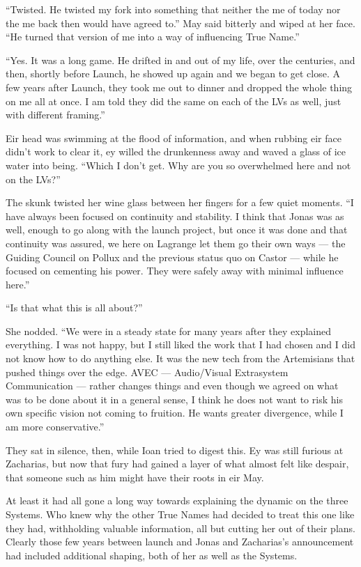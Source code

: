 ``Twisted. He twisted my fork into something that neither the me of today nor the me back then would have agreed to.'' May said bitterly and wiped at her face. ``He turned that version of me into a way of influencing True Name.''

``Yes. It was a long game. He drifted in and out of my life, over the centuries, and then, shortly before Launch, he showed up again and we began to get close. A few years after Launch, they took me out to dinner and dropped the whole thing on me all at once. I am told they did the same on each of the LVs as well, just with different framing.''

Eir head was swimming at the flood of information, and when rubbing eir face didn't work to clear it, ey willed the drunkenness away and waved a glass of ice water into being. ``Which I don't get. Why are you so overwhelmed here and not on the LVs?''

The skunk twisted her wine glass between her fingers for a few quiet moments. ``I have always been focused on continuity and stability. I think that Jonas was as well, enough to go along with the launch project, but once it was done and that continuity was assured, we here on Lagrange let them go their own ways — the Guiding Council on Pollux and the previous status quo on Castor — while he focused on cementing his power. They were safely away with minimal influence here.''

``Is that what this is all about?''

She nodded. ``We were in a steady state for many years after they explained everything. I was not happy, but I still liked the work that I had chosen and I did not know how to do anything else. It was the new tech from the Artemisians that pushed things over the edge. AVEC — Audio/Visual Extrasystem Communication — rather changes things and even though we agreed on what was to be done about it in a general sense, I think he does not want to risk his own specific vision not coming to fruition. He wants greater divergence, while I am more conservative.''

They sat in silence, then, while Ioan tried to digest this. Ey was still furious at Zacharias, but now that fury had gained a layer of what almost felt like despair, that someone such as him might have their roots in eir May.

At least it had all gone a long way towards explaining the dynamic on the three Systems. Who knew why the other True Names had decided to treat this one like they had, withholding valuable information, all but cutting her out of their plans. Clearly those few years between launch and Jonas and Zacharias's announcement had included additional shaping, both of her as well as the Systems.

